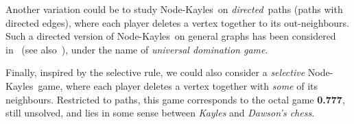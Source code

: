 \documentclass[11pt]{article}
\newcommand{\NK}{Node-Kayles}
\begin{document}
Another variation could be to study \NK\ on {\em directed\,}
paths (paths with directed edges), where each player deletes
a vertex together to its out-neighbours.
Such a directed version of \NK\ on general graphs has been considered
in~\cite{DUCHENE-GRAVIER-MHALLA-08} (see also~\cite{PHD-DUCHENE}), 
under the name of
{\em universal domination game}.

Finally, inspired by the selective rule, we could also consider
a {\em selective} \NK\ game, where each player deletes a vertex
together with {\em some} of its neighbours.
Restricted to paths, this game corresponds to the
octal game {\bf 0.777}, still unsolved, and lies in some sense between
{\em Kayles} and {\em Dawson's chess}.




\end{document}
